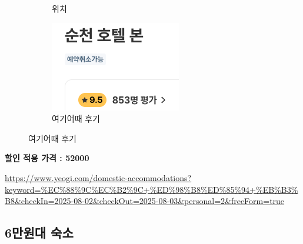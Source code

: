 \documentclass[10pt]{article}
\begin{document}
\begin{figure}[htbp]
\begin{subfigure}{0.3\textwidth}
    \caption{위치}
    \label{fig:2}
  \end{subfigure}
  \hfill
  \begin{subfigure}{0.3\textwidth}
    \centering
    \includegraphics[width=\linewidth]{fig/3_후기.png}
    \caption{여기어때 후기}
    \label{fig:3}
  \end{subfigure}
  \label{fig:three}
\end{figure}
\begin{center}
\textbf{할인 적용 가격 : 52000}
\end{center}
\url{https://www.yeogi.com/domestic-accommodations?keyword=%EC%88%9C%EC%B2%9C+%ED%98%B8%ED%85%94+%EB%B3%B8&checkIn=2025-08-02&checkOut=2025-08-03&personal=2&freeForm=true}

\newpage
\subsection{6만원대 숙소}
\end{document}
